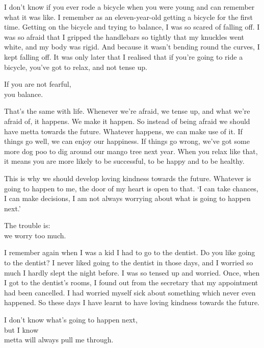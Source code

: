 \documentclass[12pt, openany]{book}
\newenvironment{aphorism}%
{%
\begin{center}\begin{itshape}
}%
{\end{itshape}\end{center}
}%
\begin{document}
I don’t know if you ever rode a bicycle when you were young and can remember what it was like. I remember as an eleven-year-old getting a bicycle for the first time. Getting on the bicycle and trying to balance, I was so scared of falling off. I was so afraid that I gripped the handlebars so tightly that my knuckles went white, and my body was rigid. And because it wasn’t bending round the curves, I kept falling off. It was only later that I realised that if you’re going to ride a bicycle, you’ve got to relax, and not tense up. 

\begin{aphorism}
If you are not fearful,\\  
you balance.
\end{aphorism}

That’s the same with life. Whenever we’re afraid, we tense up, and what we’re afraid of, it happens. We make it happen. So instead of being afraid we should have metta towards the future. Whatever happens, we can make use of it. If things go well, we can enjoy our happiness. If things go wrong, we’ve got some more dog poo to dig around our mango tree next year. When you relax like that, it means you are more likely to be successful, to be happy and to be healthy. 

This is why we should develop loving kindness towards the future. Whatever is going to happen to me, the door of my heart is open to that. ‘I can take chances, I can make decisions, I am not always worrying about what is going to happen next.’ 

\begin{aphorism}
The trouble is:\\  
we worry too much.
\end{aphorism}

I remember again when I was a kid I had to go to the dentist. Do you like going to the dentist? I never liked going to the dentist in those days, and I worried so much I hardly slept the night before. I was so tensed up and worried. Once, when I got to the dentist’s rooms, I found out from the secretary that my appointment had been cancelled. I had worried myself sick about something which never even happened. So these days I have learnt to have loving kindness towards the future. 

\begin{aphorism}
I don’t know what’s going to happen next,\\  
but I know\\ 
metta will always pull me through.
\end{aphorism}
\end{document}
